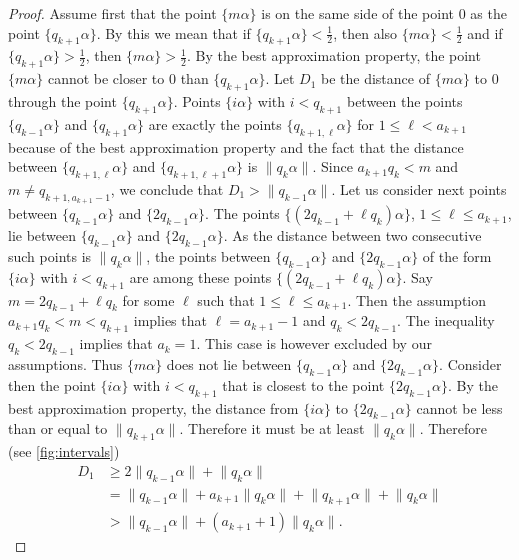 \documentclass[a4paper,fleqn]{article}
\providecommand{\norm}[1]{\lVert#1\rVert}
\begin{document}
\begin{proof}
    Assume first that the point $\{m\alpha\}$ is on the same side of the point $0$ as the point $\{q_{k+1}\alpha\}$.
    By this we mean that if $\{q_{k+1}\alpha\} < \tfrac12$, then also $\{m\alpha\} < \tfrac12$ and if
    $\{q_{k+1}\alpha\} > \tfrac12$, then $\{m\alpha\} > \tfrac 12$. By the best approximation property, the point
    $\{m\alpha\}$ cannot be closer to $0$ than $\{q_{k+1}\alpha\}$. Let $D_1$ be the distance of $\{m\alpha\}$ to $0$
    through the point $\{q_{k+1}\alpha\}$. Points $\{i\alpha\}$ with $i < q_{k+1}$ between the points
    $\{q_{k-1}\alpha\}$ and $\{q_{k+1}\alpha\}$ are exactly the points $\{q_{k+1,\ell}\alpha\}$ for
    $1 \leq \ell < a_{k+1}$ because of the best approximation property and the fact that the distance between
    $\{q_{k+1,\ell}\alpha\}$ and $\{q_{k+1,\ell+1}\alpha\}$ is $\norm{q_k\alpha}$. Since $a_{k+1}q_k < m$ and
    $m \neq q_{k+1,a_{k+1}-1}$, we conclude that $D_1 > \norm{q_{k-1}\alpha}$. Let us consider next points between
    $\{q_{k-1}\alpha\}$ and $\{2q_{k-1}\alpha\}$. The points $\{(2q_{k-1} + \ell q_k)\alpha\}$,
    $1 \leq \ell \leq a_{k+1}$, lie between $\{q_{k-1}\alpha\}$ and $\{2q_{k-1}\alpha\}$. As the distance between two
    consecutive such points is $\norm{q_k\alpha}$, the points between $\{q_{k-1}\alpha\}$ and $\{2q_{k-1}\alpha\}$ of
    the form $\{i\alpha\}$ with $i < q_{k+1}$ are among these points $\{(2q_{k-1} + \ell q_k)\alpha\}$. Say
    $m = 2q_{k-1} + \ell q_k$ for some $\ell$ such that $1 \leq \ell \leq a_{k+1}$. Then the assumption
    $a_{k+1} q_k < m < q_{k+1}$ implies that $\ell = a_{k+1} - 1$ and $q_k < 2q_{k-1}$. The inequality $q_k < 2q_{k-1}$
    implies that $a_k = 1$. This case is however excluded by our assumptions. Thus $\{m\alpha\}$ does not lie between
    $\{q_{k-1}\alpha\}$ and $\{2q_{k-1}\alpha\}$. Consider then the point $\{i\alpha\}$ with $i < q_{k+1}$ that is
    closest to the point $\{2q_{k-1}\alpha\}$. By the best approximation property, the distance from $\{i\alpha\}$ to
    $\{2q_{k-1}\alpha\}$ cannot be less than or equal to $\norm{q_{k+1}\alpha}$. Therefore it must be at least
    $\norm{q_k\alpha}$. Therefore (see \autoref{fig:intervals})
    \begin{align*}
      D_1 &\geq 2\norm{q_{k-1}\alpha} + \norm{q_k\alpha} \\
          &= \norm{q_{k-1}\alpha} + a_{k+1}\norm{q_k\alpha} + \norm{q_{k+1}\alpha} + \norm{q_k\alpha} \\
          &> \norm{q_{k-1}\alpha} + (a_{k+1} + 1)\norm{q_k\alpha}.
    \end{align*}


\end{proof}
\end{document}
